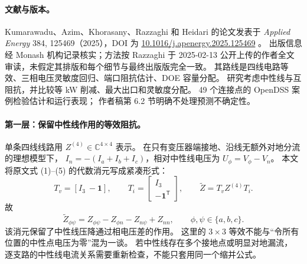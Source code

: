 \paragraph{文献与版本。}
Kumarawadu、Azim、Khorasany、Razzaghi 和 Heidari 的论文发表于
\emph{Applied Energy} 384, 125469（2025），DOI 为
\href{https://doi.org/10.1016/j.apenergy.2025.125469}{10.1016/j.apenergy.2025.125469}
\citep{S10}。
出版信息经 Monash 机构记录核实；方法按 Razzaghi 于 2025-02-13
公开上传的作者全文审读，未假定其排版和每个细节与最终出版版完全一致。
其路线是四线电路等效、三相电压灵敏度回归、端口阻抗估计、DOE 容量分配。
研究考虑中性线与互阻抗，并比较等 kW 削减、最大出口和灵敏度分配。
49 个连接点的 OpenDSS 案例检验估计和运行表现；
作者稿第 6.2 节明确不处理预测不确定性。

\paragraph{第一层：保留中性线作用的等效阻抗。}
单条四线线路用 $Z^{(4)}\in\mathbb C^{4\times4}$ 表示。
在只有变压器端接地、沿线无额外对地分流的理想模型下，
$I_n=-(I_a+I_b+I_c)$，相对中性线电压为 $U_\phi=V_\phi-V_n$。
本文将原文式 (1)--(5) 的代数消元写成紧凑形式：
\begin{equation}
 T_v=[I_3\ -\mathbf1],\qquad
 T_i=\begin{bmatrix}I_3\\-\mathbf1^{\mathsf T}\end{bmatrix},\qquad
 \widetilde Z=T_vZ^{(4)}T_i.
 \label{eq:eng-s10-neutral}
\end{equation}
故
\begin{equation}
 \widetilde Z_{\phi\psi}
 =Z_{\phi\psi}-Z_{\phi n}-Z_{n\psi}+Z_{nn},
 \qquad \phi,\psi\in\{a,b,c\}.
 \label{eq:eng-s10-zentry}
\end{equation}
该消元保留了中性线压降通过相电压差的作用。
这里的 $3\times3$ 等效不能与“令所有位置的中性点电压为零”混为一谈。
若中性线存在多个接地点或明显对地漏流，
逐支路的中性线电流关系需要重新检查，不能只套用同一个缩并公式。

